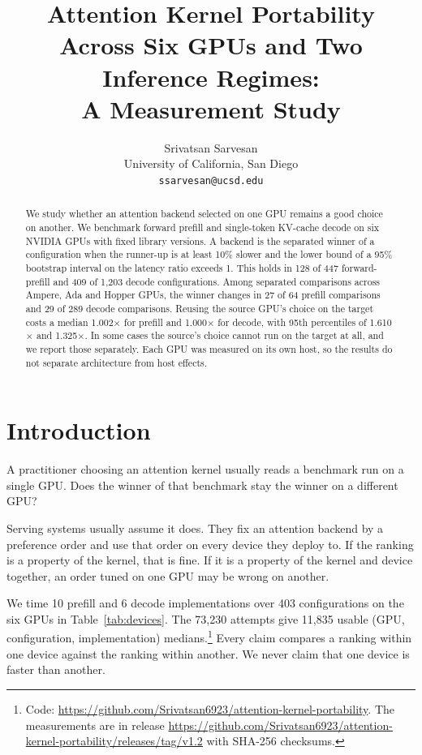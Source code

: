 \documentclass[11pt]{article}
\title{Attention Kernel Portability Across Six GPUs and Two Inference Regimes:\\
       A Measurement Study}
\author{Srivatsan Sarvesan \\
  University of California, San Diego \\
  \texttt{ssarvesan@ucsd.edu} \\}
\begin{document}
\maketitle

\begin{abstract}
We study whether an attention backend selected on one GPU remains a good choice
on another. We benchmark forward prefill and single-token KV-cache decode on six
NVIDIA GPUs with fixed library versions. A backend is the separated winner of a
configuration when the runner-up is at least 10\% slower and the lower bound of
a 95\% bootstrap interval on the latency ratio exceeds 1. This holds in 128 of
447 forward-prefill and 409 of 1{,}203 decode configurations. Among separated
comparisons across Ampere, Ada and Hopper GPUs, the winner changes in 27 of 64
prefill comparisons and 29 of 289 decode comparisons. Reusing the source GPU's
choice on the target costs a median 1.002$\times$ for prefill and 1.000$\times$
for decode, with 95th percentiles of 1.610$\times$ and 1.325$\times$. In some
cases the source's choice cannot run on the target at all, and we report those
separately. Each GPU was measured on its own host, so the results do not
separate architecture from host effects.
\end{abstract}

\section{Introduction}

A practitioner choosing an attention kernel usually reads a benchmark run on a
single GPU. Does the winner of that benchmark stay the winner on a different
GPU?

Serving systems usually assume it does. They fix an attention backend by a
preference order and use that order on every device they deploy to. If the
ranking is a property of the kernel, that is fine. If it is a property of the
kernel and device together, an order tuned on one GPU may be wrong on another.

We time 10 prefill and 6 decode implementations over 403 configurations on the
six GPUs in Table~\ref{tab:devices}. The 73{,}230 attempts give 11{,}835 usable
(GPU, configuration, implementation) medians.\footnote{Code:
\url{https://github.com/Srivatsan6923/attention-kernel-portability}. The
measurements are in release
\url{https://github.com/Srivatsan6923/attention-kernel-portability/releases/tag/v1.2}
with SHA-256 checksums.}
Every claim compares a ranking within one device against the ranking within
another. We never claim that one device is faster than another.
\end{document}
